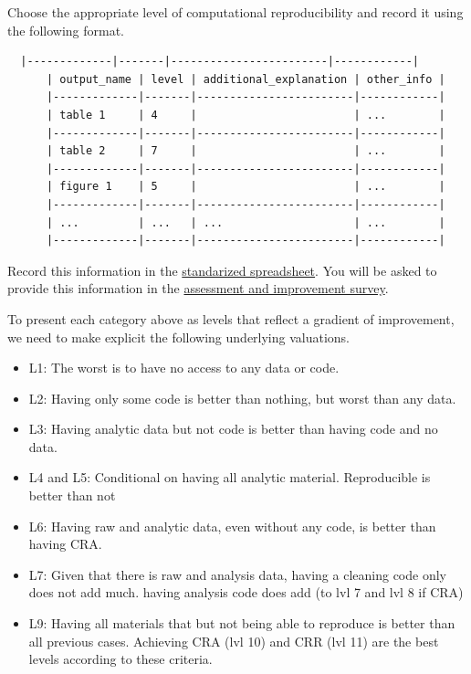 \documentclass[]{book}
\providecommand{\tightlist}{%
  \setlength{\itemsep}{0pt}\setlength{\parskip}{0pt}}
\begin{document}
Choose the appropriate level of computational reproducibility and record it using the following format.

\begin{verbatim}
  |-------------|-------|------------------------|------------|
      | output_name | level | additional_explanation | other_info |
      |-------------|-------|------------------------|------------|
      | table 1     | 4     |                        | ...        |
      |-------------|-------|------------------------|------------|
      | table 2     | 7     |                        | ...        |
      |-------------|-------|------------------------|------------|
      | figure 1    | 5     |                        | ...        |
      |-------------|-------|------------------------|------------|
      | ...         | ...   | ...                    | ...        |
      |-------------|-------|------------------------|------------|
\end{verbatim}

Record this information in the \href{https://docs.google.com/spreadsheets/d/1LUIdVFH0OfR70C7z07TYeE-uWzKI_JIeWUMaYhqEKK0/edit\#gid=1384504774\&range=A1}{standarized spreadsheet}. You will be asked to provide this information in the \href{ADD\%20LINK}{assessment and improvement survey}.

To present each category above as levels that reflect a gradient of improvement, we need to make explicit the following underlying valuations.

\begin{itemize}
\tightlist
\item
  L1: The worst is to have no access to any data or code.\\
\item
  L2: Having only some code is better than nothing, but worst than any data.
\item
  L3: Having analytic data but not code is better than having code and no data.
\item
  L4 and L5: Conditional on having all analytic material. Reproducible is better than not
\item
  L6: Having raw and analytic data, even without any code, is better than having CRA.\\
\item
  L7: Given that there is raw and analysis data, having a cleaning code only does not add much. having analysis code does add (to lvl 7 and lvl 8 if CRA)\\
\item
  L9: Having all materials that but not being able to reproduce is better than all previous cases. Achieving CRA (lvl 10) and CRR (lvl 11) are the best levels according to these criteria.
\end{itemize}
\end{document}
